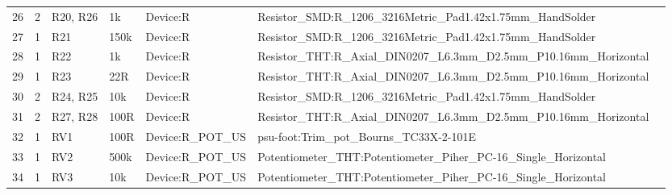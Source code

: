 \documentclass[letterpaper,twocolumn,10pt]{article}
\begin{document}
\begin{sidewaystable*}[ht]
{\begin{tabular}{cclllll}
      26                     & 2                                                        & R20, R26               & 1k                     & Device:R                         & Resistor\_SMD:R\_1206\_3216Metric\_Pad1.42x1.75mm\_HandSolder                                           \\
      27                     & 1                                                        & R21                    & 150k                   & Device:R                         & Resistor\_SMD:R\_1206\_3216Metric\_Pad1.42x1.75mm\_HandSolder                                           \\
      28                     & 1                                                        & R22                    & 1k                     & Device:R                         & Resistor\_THT:R\_Axial\_DIN0207\_L6.3mm\_D2.5mm\_P10.16mm\_Horizontal                                   \\
      29                     & 1                                                        & R23                    & 22R                    & Device:R                         & Resistor\_THT:R\_Axial\_DIN0207\_L6.3mm\_D2.5mm\_P10.16mm\_Horizontal                                   \\
      30                     & 2                                                        & R24, R25               & 10k                    & Device:R                         & Resistor\_SMD:R\_1206\_3216Metric\_Pad1.42x1.75mm\_HandSolder                                           \\
      31                     & 2                                                        & R27, R28               & 100R                   & Device:R                         & Resistor\_THT:R\_Axial\_DIN0207\_L6.3mm\_D2.5mm\_P10.16mm\_Horizontal                                   \\
      32                     & 1                                                        & RV1                    & 100R                   & Device:R\_POT\_US                & psu-foot:Trim\_pot\_Bourns\_TC33X-2-101E                                                                \\
      33                     & 1                                                        & RV2                    & 500k                   & Device:R\_POT\_US                & Potentiometer\_THT:Potentiometer\_Piher\_PC-16\_Single\_Horizontal                                      \\
      34                     & 1                                                        & RV3                    & 10k                    & Device:R\_POT\_US                & Potentiometer\_THT:Potentiometer\_Piher\_PC-16\_Single\_Horizontal                                      \\

\end{tabular}}
\end{sidewaystable*}
\end{document}
